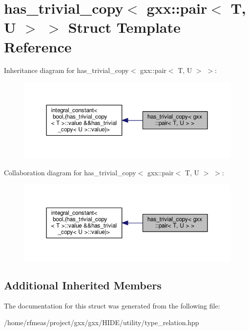\hypertarget{structhas__trivial__copy_3_01gxx_1_1pair_3_01T_00_01U_01_4_01_4}{}\section{has\+\_\+trivial\+\_\+copy$<$ gxx\+:\+:pair$<$ T, U $>$ $>$ Struct Template Reference}
\label{structhas__trivial__copy_3_01gxx_1_1pair_3_01T_00_01U_01_4_01_4}


Inheritance diagram for has\+\_\+trivial\+\_\+copy$<$ gxx\+:\+:pair$<$ T, U $>$ $>$\+:
\nopagebreak
\begin{figure}[H]
\begin{center}
\leavevmode
\includegraphics[width=350pt]{structhas__trivial__copy_3_01gxx_1_1pair_3_01T_00_01U_01_4_01_4__inherit__graph}
\end{center}
\end{figure}


Collaboration diagram for has\+\_\+trivial\+\_\+copy$<$ gxx\+:\+:pair$<$ T, U $>$ $>$\+:
\nopagebreak
\begin{figure}[H]
\begin{center}
\leavevmode
\includegraphics[width=350pt]{structhas__trivial__copy_3_01gxx_1_1pair_3_01T_00_01U_01_4_01_4__coll__graph}
\end{center}
\end{figure}
\subsection*{Additional Inherited Members}


The documentation for this struct was generated from the following file\+:\begin{DoxyCompactItemize}
\item 
/home/rfmeas/project/gxx/gxx/\+H\+I\+D\+E/utility/type\+\_\+relation.\+hpp\end{DoxyCompactItemize}
